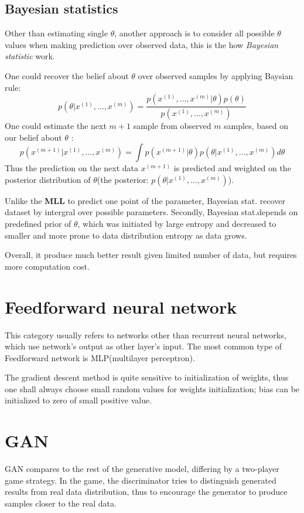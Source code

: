 \documentclass{article}
\begin{document}
\subsection*{Bayesian statistics}
Other than estimating single $\theta$, another approach is to consider all possible $\theta$ values when making prediction over observed data, this is the how \textit{Bayesian statistic} work. \par
One could recover the belief about $\theta$ over observed samples by applying Baysian rule:
\begin{equation}
    p(\theta|x^{(1)},\dots,x^{(m)}) = \frac{p(x^{(1)},\dots,x^{(m)}|\theta)p(\theta)}{p(x^{(1)},\dots,x^{(m)})}
\end{equation}
One could estimate the next $m+1$ sample from observed $m$ samples, based on our belief about $\theta$ :
\begin{equation}
    p(x^{(m+1)}|x^{(1)},\dots,x^{(m)}) = \int p(x^{(m+1)}|\theta)p(\theta|x^{(1)},\dots,x^{(m)})d\theta
\end{equation}
Thus the prediction on the next data $x^{(m+1)}$ is predicted and weighted on the posterior distribution of $\theta$(the posterior: $p(\theta|x^{(1)},\dots,x^{(m)})$).\par
Unlike the \textbf{MLL} to predict one point of the parameter, Bayesian stat. recover dataset by intergral over possible parameters. Secondly, Bayesian stat.depends on predefined prior of $\theta$, which was initiated by large entropy and decreased to smaller and more prone to data distribution entropy as data grows.\par
Overall, it produce much better result given limited number of data, but requires more computation cost.

\section{Feedforward neural network}
This category usually refers to networks other than recurrent neural networks, which use network's output as other layer's input. The most common type of Feedforward network is MLP(multilayer perceptron).

The gradient descent method is quite sensitive to initialization of weights, thus one shall always choose small random values for weights initialization; bias can be initialized to zero of small positive value.
\section{GAN}
GAN compares to the rest of the generative model, differing by a two-player game strategy. In the game, the discriminator tries to distinguish generated results from real data distribution, thus to encourage the generator to produce samples closer to the real data. \\
\end{document}
